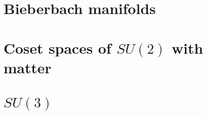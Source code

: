 \documentclass{beamer}
\begin{document}
\section{Bieberbach manifolds}
\section{Coset spaces of $SU(2)$ with matter}
\section{$SU(3)$}
\end{document}
